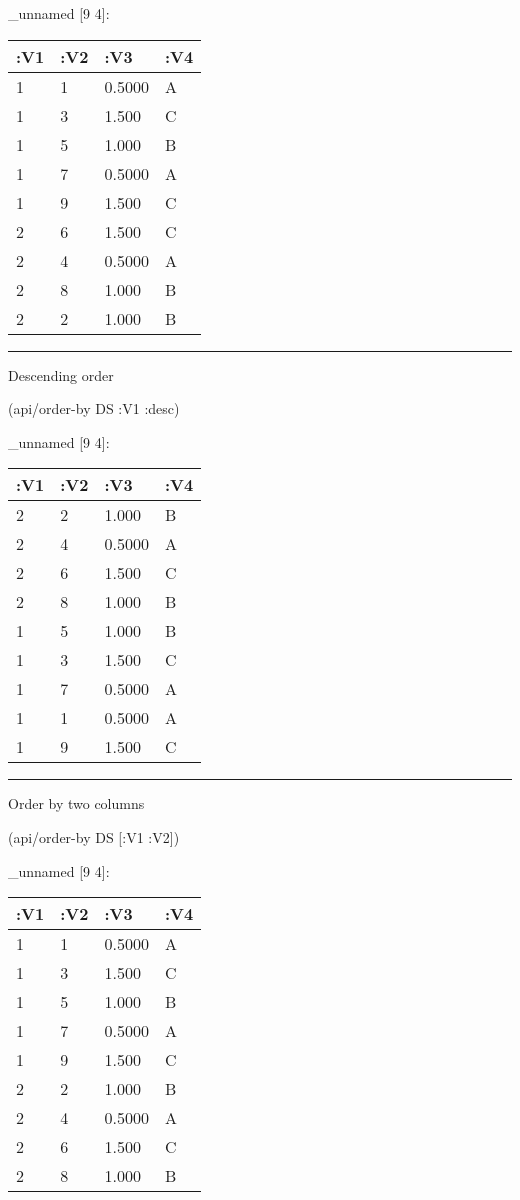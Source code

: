 \documentclass[]{article}
\newenvironment{Shaded}{\begin{snugshade}}{\end{snugshade}}
\newcommand{\AttributeTok}[1]{\textcolor[rgb]{0.77,0.63,0.00}{#1}}
\newcommand{\NormalTok}[1]{#1}
\begin{document}
\_unnamed {[}9 4{]}:

\begin{longtable}[]{@{}llll@{}}
\toprule
:V1 & :V2 & :V3 & :V4\tabularnewline
\midrule
\endhead
1 & 1 & 0.5000 & A\tabularnewline
1 & 3 & 1.500 & C\tabularnewline
1 & 5 & 1.000 & B\tabularnewline
1 & 7 & 0.5000 & A\tabularnewline
1 & 9 & 1.500 & C\tabularnewline
2 & 6 & 1.500 & C\tabularnewline
2 & 4 & 0.5000 & A\tabularnewline
2 & 8 & 1.000 & B\tabularnewline
2 & 2 & 1.000 & B\tabularnewline
\bottomrule
\end{longtable}

\begin{center}\rule{0.5\linewidth}{0.5pt}\end{center}

Descending order

\begin{Shaded}
\begin{Highlighting}[]
\NormalTok{(api/order-by DS }\AttributeTok{:V1} \AttributeTok{:desc}\NormalTok{)}
\end{Highlighting}
\end{Shaded}

\_unnamed {[}9 4{]}:

\begin{longtable}[]{@{}llll@{}}
\toprule
:V1 & :V2 & :V3 & :V4\tabularnewline
\midrule
\endhead
2 & 2 & 1.000 & B\tabularnewline
2 & 4 & 0.5000 & A\tabularnewline
2 & 6 & 1.500 & C\tabularnewline
2 & 8 & 1.000 & B\tabularnewline
1 & 5 & 1.000 & B\tabularnewline
1 & 3 & 1.500 & C\tabularnewline
1 & 7 & 0.5000 & A\tabularnewline
1 & 1 & 0.5000 & A\tabularnewline
1 & 9 & 1.500 & C\tabularnewline
\bottomrule
\end{longtable}

\begin{center}\rule{0.5\linewidth}{0.5pt}\end{center}

Order by two columns

\begin{Shaded}
\begin{Highlighting}[]
\NormalTok{(api/order-by DS [}\AttributeTok{:V1} \AttributeTok{:V2}\NormalTok{])}
\end{Highlighting}
\end{Shaded}

\_unnamed {[}9 4{]}:

\begin{longtable}[]{@{}llll@{}}
\toprule
:V1 & :V2 & :V3 & :V4\tabularnewline
\midrule
\endhead
1 & 1 & 0.5000 & A\tabularnewline
1 & 3 & 1.500 & C\tabularnewline
1 & 5 & 1.000 & B\tabularnewline
1 & 7 & 0.5000 & A\tabularnewline
1 & 9 & 1.500 & C\tabularnewline
2 & 2 & 1.000 & B\tabularnewline
2 & 4 & 0.5000 & A\tabularnewline
2 & 6 & 1.500 & C\tabularnewline
2 & 8 & 1.000 & B\tabularnewline
\bottomrule
\end{longtable}
\end{document}
